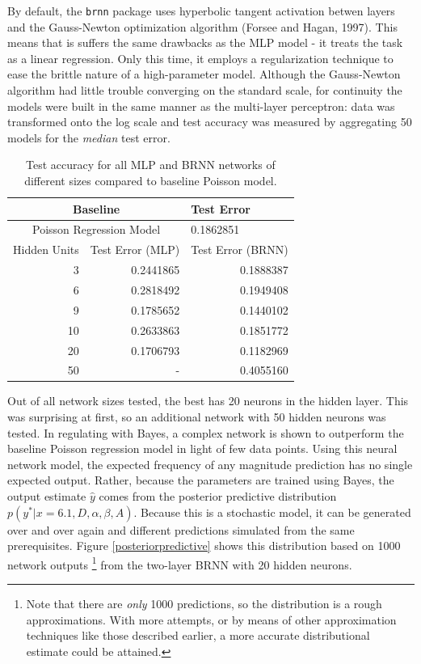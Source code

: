 By default, the \texttt{brnn} package uses hyperbolic tangent activation betwen layers and the Gauss-Newton optimization algorithm (Forsee and Hagan, 1997).  This means that is suffers the same drawbacks as the MLP model - it treats the task as a linear regression.  Only this time, it employs a regularization technique to ease the brittle nature of a high-parameter model.
Although the Gauss-Newton algorithm had little trouble converging on the standard scale, for continuity the models were built in the same manner as the multi-layer perceptron: data was transformed onto the log scale and test accuracy was measured by aggregating 50 models for the \textit{median} test error.

\begin{table}[H]
\centering
\begin{tabular}{rrr}
  \hline
\multicolumn{2}{c}{Baseline} & \multicolumn{1}{l}{Test Error} \\ 
  \hline
  \multicolumn{2}{c}{Poisson Regression Model} & \multicolumn{1}{l}{0.1862851} \\ 
  \hline
Hidden Units & Test Error (MLP) & Test Error (BRNN) \\ 
  \hline
3 & 0.2441865  & 0.1888387 \\ 
6 & 0.2818492  & 0.1949408 \\ 
9 & 0.1785652  & 0.1440102 \\ 
10 & 0.2633863  & 0.1851772 \\ 
20 & 0.1706793  & 0.1182969 \\ 
 50 & - & 0.4055160 \\ 
   \hline
\end{tabular}
   \caption{Test accuracy for all MLP and BRNN networks of different sizes compared to baseline Poisson model.}
\end{table}



Out of all network sizes tested, the best has 20 neurons in the hidden layer.  This was surprising at first, so an additional network with 50 hidden neurons was tested.  In regulating with Bayes, a complex network is shown to outperform the baseline Poisson regression model in light of few data points.  Using this neural network model, the expected frequency of any magnitude prediction has no single expected output.  Rather, because the parameters are trained using Bayes, the output estimate $\hat{y}$ comes from the posterior predictive distribution $p(y^*|x=6.1,D,\alpha,\beta,A)$.  Because this is a stochastic model, it can be generated over and over again and different predictions simulated from the same prerequisites.  Figure \ref{posteriorpredictive} shows this distribution based on 1000 network outputs 
\footnote{Note that there are \textit{only} 1000 predictions, so the distribution is a rough approximations.  With more attempts, or by means of other approximation techniques like those described earlier, a more accurate distributional estimate could be attained.}
 from the two-layer BRNN with 20 hidden neurons.

